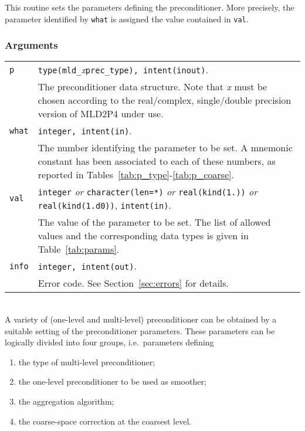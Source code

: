 \noindent
This routine sets the parameters defining the preconditioner. More
precisely, the parameter identified by \verb|what| is assigned the value
contained in \verb|val|.

\subsubsection*{Arguments}

\begin{tabular}{p{1.2cm}p{11.5cm}}
\verb|p|      & \verb|type(mld_|\emph{x}\verb|prec_type), intent(inout)|.\\
              & The preconditioner data structure. Note that \emph{x} must
                be chosen according to the real/complex, single/double precision
                 version of MLD2P4 under use.\\
\verb|what|   & \verb|integer, intent(in)|. \\
              & The number identifying the parameter to be set.
                A mnemonic constant has been associated to each of these
                numbers, as reported in Tables~\ref{tab:p_type}-\ref{tab:p_coarse}.\\
\verb|val |   & \verb|integer| \emph{or} \verb|character(len=*)| \emph{or}
                \verb|real(kind(1.))| \emph{or} \verb|real(kind(1.d0))|,
                \verb|intent(in)|.\\
              & The value of the parameter to be set. The list of allowed
                values and the corresponding data types is given in
                Table~\ref{tab:params}.\\
\verb|info|   & \verb|integer, intent(out)|.\\
              & Error code. See Section~\ref{sec:errors} for details.\\
\end{tabular}

\ \\
A variety of (one-level and multi-level) preconditioner can be obtained
by a suitable setting of the preconditioner parameters. These parameters
can be logically divided into four groups, i.e.\ parameters defining
\begin{enumerate}
	\item the type of multi-level preconditioner;
	\item the one-level preconditioner to be used as smoother;
	\item the aggregation algorithm;
	\item the coarse-space correction at the coarsest level.
\end{enumerate}

